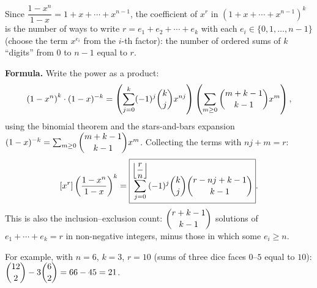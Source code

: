 Since $\dfrac{1-x^n}{1-x}=1+x+\cdots+x^{n-1}$, the coefficient of $x^r$ in $\left(1+x+\cdots+x^{n-1}\right)^k$ is the number of ways to write $r=e_1+e_2+\cdots+e_k$ with each $e_i\in\{0,1,\dots,n-1\}$ (choose the term $x^{e_i}$ from the $i$-th factor): the number of ordered sums of $k$ ``digits'' from $0$ to $n-1$ equal to $r$.

\textbf{Formula.} Write the power as a product:
\[
\left(1-x^n\right)^k\cdot(1-x)^{-k}=\left(\sum_{j=0}^{k}(-1)^j\dbinom kj x^{nj}\right)\left(\sum_{m\ge0}\dbinom{m+k-1}{k-1}x^m\right),
\]
using the binomial theorem and the stars-and-bars expansion $(1-x)^{-k}=\sum_{m\ge0}\dbinom{m+k-1}{k-1}x^m$. Collecting the terms with $nj+m=r$:
\[
[x^r]\left(\dfrac{1-x^n}{1-x}\right)^k=\boxed{\sum_{j=0}^{\left\lfloor\dfrac {r}{n}\right\rfloor}(-1)^j\dbinom kj\dbinom{r-nj+k-1}{k-1}}.
\]
This is also the inclusion--exclusion count: $\dbinom{r+k-1}{k-1}$ solutions of $e_1+\cdots+e_k=r$ in non-negative integers, minus those in which some $e_i\ge n$.

For example, with $n=6$, $k=3$, $r=10$ (sums of three dice faces $0$--$5$ equal to $10$): $\dbinom{12}{2}-3\dbinom62=66-45=21$.
